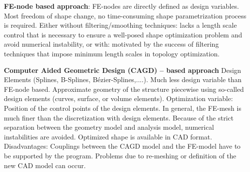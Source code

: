 \textbf{FE-node based approach}:
FE-nodes are directly defined as design variables.
Most freedom of shape change, no time-consuming shape parametrization process is required.
Either without filtering/smoothing techniques: lacks a length scale control that is necessary to ensure a well-posed shape optimization problem and avoid numerical instability, 
or with: motivated by the success of filtering techniques that impose minimum length scales in topology optimization.

\textbf{Computer Aided Geometric Design (CAGD) – based approach}
Design Elements (Splines, B-Splines, Bézier-Splines,....). Much less design variable than FE-node based.
Approximate geometry of the structure piecewise using so-called design elements (curves, surface, or volume elements).
Optimization variable: Position of the control points of the design elements. 
In general, the FE-mesh is much finer than the discretization with design elements. 
Because of the strict separation between the geometry model and analysis model, numerical instabilities are avoided.
Optimized shape is available in CAD format. 
Disadvantages:
Couplings between the CAGD model and the FE-model have to be supported by the program.
Problems due to re-meshing or definition of the new CAD model can occur.

